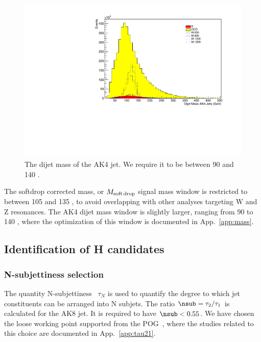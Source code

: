 \begin{figure}[thb!]
\begin{center}
\includegraphics[scale=0.5]{F5/shapedijetmass.pdf}
\end{center}
\caption{The dijet mass of the AK4 jet. We require it to be between 90 and 140 \GeV.}
\label{fig:AK4dijetmass}
\end{figure}

The softdrop corrected mass, or $M_{\rm soft\,drop}$ signal mass window is restricted to between 105 and 135 \GeV, to avoid overlapping with other analyses targeting W and Z resonances. The AK4 dijet mass window is slightly larger, ranging from 90 to 140 \GeV, where the optimization of this window is documented in App.~\ref{app:mass}.

\subsection{Identification of H candidates\label{ss:HTag}}

\subsubsection{N-subjettiness selection\label{sec:EvtSelNsubjettiness}}

The quantity N-subjettiness~\cite{Thaler:2010tr,Thaler:2011gf,Stewart:2010tn} $\tau_N$ is used to quantify the degree to which jet constituents can be arranged into N subjets. The ratio $\nsub = \tau_2/\tau_1$  is calculated for the AK8 jet. It is required to have $\nsub < 0.55$. We have chosen the loose working point supported from the POG~\cite{WTagTWikiWPs}, where the studies related to this choice are documented in App.~\ref{app:tau21}. 

